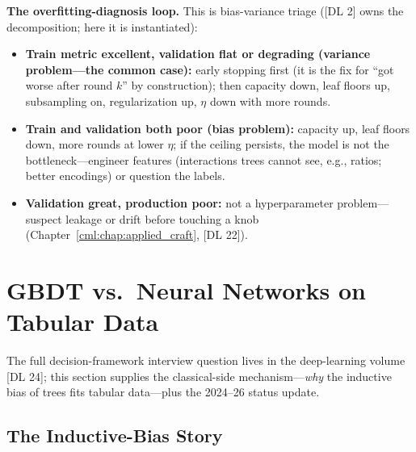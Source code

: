 \textbf{The overfitting-diagnosis loop.} This is bias-variance triage ([DL 2] owns the decomposition; here it is instantiated):
\begin{itemize}
    \item \textbf{Train metric excellent, validation flat or degrading (variance problem---the common case):} early stopping first (it is the fix for ``got worse after round $k$'' by construction); then capacity down, leaf floors up, subsampling on, regularization up, $\eta$ down with more rounds.
    \item \textbf{Train and validation both poor (bias problem):} capacity up, leaf floors down, more rounds at lower $\eta$; if the ceiling persists, the model is not the bottleneck---engineer features (interactions trees cannot see, e.g., ratios; better encodings) or question the labels.
    \item \textbf{Validation great, production poor:} not a hyperparameter problem---suspect leakage or drift before touching a knob (Chapter~\ref{cml:chap:applied_craft}, [DL 22]).
\end{itemize}

\section{GBDT vs.\ Neural Networks on Tabular Data}
\label{cml:sec:tabular_nn}

The full decision-framework interview question lives in the deep-learning volume [DL 24]; this section supplies the classical-side mechanism---\textit{why} the inductive bias of trees fits tabular data---plus the 2024--26 status update.

\subsection{The Inductive-Bias Story}

